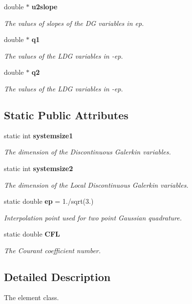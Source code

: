 \begin{DoxyCompactItemize}
double $\ast$ {\bf u2slope}
\begin{DoxyCompactList}\small\item\em The values of slopes of the D\-G variables in ep. \end{DoxyCompactList}\item 
double $\ast$ {\bf q1}
\begin{DoxyCompactList}\small\item\em The values of the L\-D\-G variables in -\/ep. \end{DoxyCompactList}\item 
double $\ast$ {\bf q2}
\begin{DoxyCompactList}\small\item\em The values of the L\-D\-G variables in -\/ep. \end{DoxyCompactList}\end{DoxyCompactItemize}
\subsection*{Static Public Attributes}
\begin{DoxyCompactItemize}
\item 
static int {\bf systemsize1}
\begin{DoxyCompactList}\small\item\em The dimension of the Discontinuous Galerkin variables. \end{DoxyCompactList}\item 
static int {\bf systemsize2}
\begin{DoxyCompactList}\small\item\em The dimension of the Local Discontinuous Galerkin variables. \end{DoxyCompactList}\item 
static double {\bf ep} = 1./sqrt(3.)
\begin{DoxyCompactList}\small\item\em Interpolation point used for two point Gaussian quadrature. \end{DoxyCompactList}\item 
static double {\bf C\-F\-L}
\begin{DoxyCompactList}\small\item\em The Courant coefficient number. \end{DoxyCompactList}\end{DoxyCompactItemize}


\subsection{Detailed Description}
The element class. 

